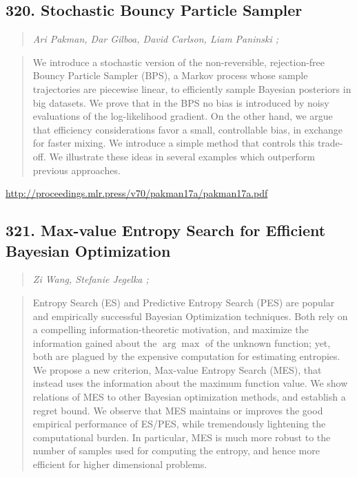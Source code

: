 \documentclass{article}
\begin{document}
\subsection{320. Stochastic Bouncy Particle Sampler}

\begin{quote}
\footnotesize{\textit{Ari Pakman, Dar Gilboa, David Carlson, Liam Paninski ;}}
\end{quote}

\begin{quote}
    We introduce a stochastic version of the non-reversible, rejection-free Bouncy Particle Sampler (BPS), a Markov process whose sample trajectories are piecewise linear, to efficiently sample Bayesian posteriors in big datasets. We prove that in the BPS no bias is introduced by noisy evaluations of the log-likelihood gradient. On the other hand, we argue that efficiency considerations favor a small, controllable bias, in exchange for faster mixing. We introduce a simple method that controls this trade-off. We illustrate these ideas in several examples which outperform previous approaches.  \end{quote}

\href{http://proceedings.mlr.press/v70/pakman17a/pakman17a.pdf}{http://proceedings.mlr.press/v70/pakman17a/pakman17a.pdf}

\subsection{321. Max-value Entropy Search for Efficient Bayesian Optimization}

\begin{quote}
\footnotesize{\textit{Zi Wang, Stefanie Jegelka ;}}
\end{quote}

\begin{quote}
    Entropy Search (ES) and Predictive Entropy Search (PES) are popular and empirically successful Bayesian Optimization techniques. Both rely on a compelling information-theoretic motivation, and maximize the information gained about the $\arg\max$ of the unknown function; yet, both are plagued by the expensive computation for estimating entropies. We propose a new criterion, Max-value Entropy Search (MES), that instead uses the information about the maximum function value. We show relations of MES to other Bayesian optimization methods, and establish a regret bound. We observe that MES maintains or improves the good empirical performance of ES/PES, while tremendously lightening the computational burden. In particular, MES is much more robust to the number of samples used for computing the entropy, and hence more efficient for higher dimensional problems.  \end{quote}
\end{document}
